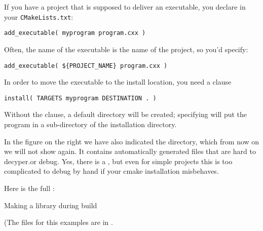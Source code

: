 \begin{floatingfigure}[r]{2.5in}
  \begin{minipage}{2.5in}
  \end{minipage}
\end{floatingfigure}
%
If you have a project that is supposed to deliver an executable,
you declare in your \texttt{CMakeLists.txt}:
\begin{lstlisting}
add_executable( myprogram program.cxx )
\end{lstlisting}
Often, the name of the executable is the name of the project,
so you'd specify:
\begin{lstlisting}
add_executable( ${PROJECT_NAME} program.cxx )
\end{lstlisting}
%
In order to move the executable to the install location,
you need a clause
\begin{lstlisting}
install( TARGETS myprogram DESTINATION . )
\end{lstlisting}
Without the  clause, a default  directory
will be created; specifying  will put the
program in a  sub-directory of the installation directory.

\begin{floatingfigure}[r]{2.5in}\vskip3in\end{floatingfigure}
%
In the figure on the right we have also indicated the  directory,
which from now on we will not show again.
It contains automatically generated files that are hard to
decyper.or debug. Yes, there is a , but even for simple
projects this is too complicated to debug by hand if your cmake
installation misbehaves.

Here is the full :
%


\newpage
{} {Making a library during build}

(The files for this examples are in .

